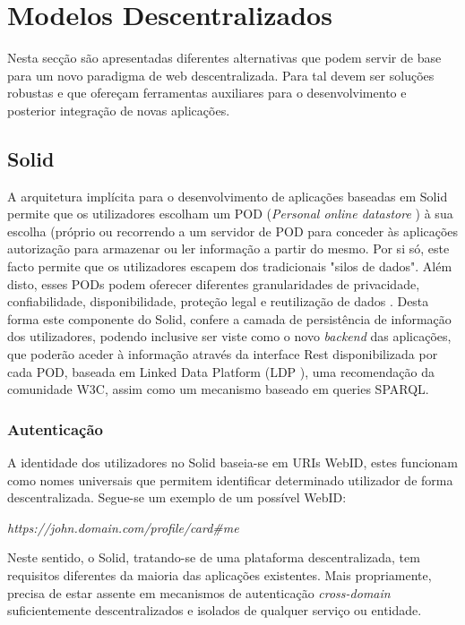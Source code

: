 \section{Modelos Descentralizados}
Nesta secção são apresentadas diferentes alternativas que podem servir de base para um novo paradigma de web descentralizada. Para tal devem ser soluções robustas e que ofereçam ferramentas auxiliares para o desenvolvimento e posterior integração de novas aplicações.

\subsection{Solid}
A arquitetura implícita para o desenvolvimento de aplicações baseadas em Solid permite que os utilizadores escolham um POD (\emph{Personal online datastore} \label{sym:POD})  à sua escolha (próprio ou recorrendo a um servidor de POD para conceder às aplicações autorização para armazenar ou ler informação a partir do mesmo. Por si só, este facto permite que os utilizadores escapem dos tradicionais "silos de dados". Além disto, esses PODs podem oferecer diferentes granularidades de privacidade, confiabilidade, disponibilidade, proteção legal e reutilização de dados \cite{solid_official}. Desta forma este componente do Solid, confere a camada de persistência de informação dos utilizadores, podendo inclusive ser viste como o novo \emph{backend} das aplicações, que poderão aceder à informação através da interface Rest \cite{rest_foundations} disponibilizada por cada POD, baseada em Linked Data Platform (LDP \label{sym:LDP}), uma recomendação da comunidade W3C, assim como um mecanismo baseado em queries SPARQL.\cite{solid_spec}

\subsubsection{Autenticação}
A identidade dos utilizadores no Solid baseia-se em URIs WebID, estes funcionam como nomes universais que permitem identificar determinado utilizador de forma descentralizada. Segue-se um exemplo de um possível WebID:

\emph{https://john.domain.com/profile/card\#me}

Neste sentido, o Solid, tratando-se de uma plataforma descentralizada, tem requisitos diferentes da maioria das aplicações existentes. Mais propriamente, precisa de estar assente em mecanismos de autenticação \emph{cross-domain} suficientemente descentralizados e isolados de qualquer serviço ou entidade.\cite{solid_spec}

